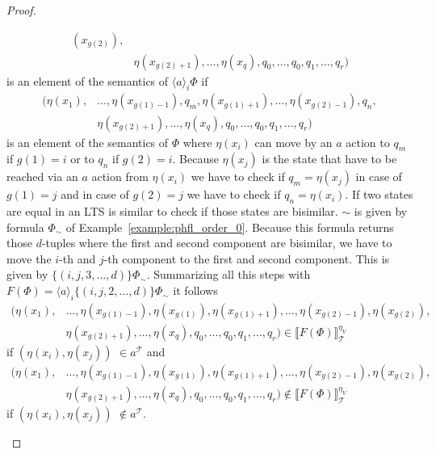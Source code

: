 \begin{proof}
\begin{compactitem}
\begin{align*}
            (x_{g(2)}),\\& \eta(x_{g(2)+1}), \dots, \eta(x_q), q_0, \dots, q_0, q_1, \dots, q_r)
        \end{align*}
        is an element of the semantics of $\langle a \rangle_i \Phi$ if
        \begin{align*}
            (\eta(x_1),& \dots, \eta(x_{g(1) - 1}), q_m, \eta(x_{g(1)+1}), \dots, \eta(x_{g(2)-1}), q_n,\\& \eta(x_{g(2)
            +1}), \dots, \eta(x_q), q_0, \dots, q_0, q_1, \dots, q_r)
        \end{align*}
        is an element of the semantics of $\Phi$ where $\eta(x_i)$ can
        move by an $a$ action to $q_m$ if $g(1) = i$ or to $q_n$ if $g(2) = i$. Because $\eta(x_j)$ is the state that
        have to be reached via an $a$ action from $\eta(x_i)$ we have to check if $q_m = \eta(x_j)$ in case of $g(1)
        = j$ and in case of $g(2) = j$ we have to check if $q_n = \eta(x_i)$. If two states are equal in an LTS is
        similar to check if those states are bisimilar. $\sim$ is given by formula $\Phi_\sim$ of
        Example~\ref{example:phfl_order_0}.
        Because this formula returns those $d$-tuples where the first and second component are bisimilar, we have to
        move the $i$-th and $j$-th component to the first and second component. This is given by $\{(i, j, 3, \dots, d
        )\} \Phi_\sim$. Summarizing all this steps with $F(\Phi) = \langle a \rangle_i \{(i, j, 2, \dots, d)\}
        \Phi_\sim$ it follows
        \begin{align*}
            (\eta(x_1),& \dots, \eta(x_{g(1) - 1}), \eta(x_{g(1)}), \eta(x_{g(1)+1}), \dots, \eta(x_{g(2)-1}), \eta
            (x_{g(2)}),\\& \eta(x_{g(2)+1}), \dots, \eta(x_q), q_0, \dots, q_0, q_1, \dots, q_r) \in \llbracket F(\Phi) \rrbracket^{\eta_V}_\mathcal{T}
        \end{align*}
        if $(\eta(x_i), \eta(x_j))$ $ \in a^\mathcal{T}$ and
        \begin{align*}
            (\eta(x_1),& \dots, \eta(x_{g(1) - 1}), \eta(x_{g(1)}), \eta(x_{g(1)+1}), \dots, \eta(x_{g(2)-1}), \eta
            (x_{g(2)}),\\& \eta(x_{g(2)+1}), \dots, \eta(x_q), q_0, \dots, q_0, q_1, \dots, q_r) \not\in \llbracket F(\Phi) \rrbracket^{\eta_V}_\mathcal{T}
        \end{align*}
        if $(\eta(x_i), \eta(x_j))$ $ \not\in a^\mathcal{T}$.


\end{compactitem}
\end{proof}
